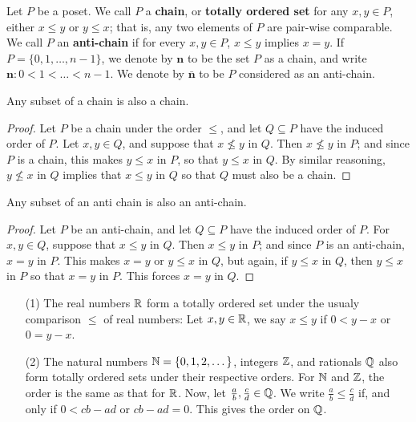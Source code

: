 \begin{definition}
  Let $P$ be a poset. We call $P$ a \textbf{chain}, or \textbf{totally
  ordered set} for any $x,y \in P$, either $x \leq y$ or $y \leq x$;
  that is, any two elements of $P$ are pair-wise comparable. We call
  $P$ an  \textbf{anti-chain} if for every $x,y \in P$, $x \leq y$
  implies $x=y$. If $P=\{0, 1, \dots, n-1\}$, we denote by
  $\textbf{n}$ to be the set $P$ as a chain, and write
  $\textbf{n}:0<1< \dots < n-1$. We denote by $\bar{\textbf{n}}$ to be
  $P$ considered as an anti-chain.
\end{definition}

\begin{lemma}\label{lemma_1.1.1}
  Any subset of a chain is also a chain.
\end{lemma}
\begin{proof}
  Let $P$ be a chain under the order $\leq$, and let $Q \subseteq P$
  have the induced order of $P$. Let  $x,y \in Q$, and suppose that $x
  \nleq y$ in $Q$. Then  $x \nleq y$ in $P$; and since $P$ is a chain,
  this makes  $y \leq x$ in $P$, so that  $y \leq x$ in $Q$.
  By similar reasoning,  $y \nleq x$ in $Q$ implies that $x \leq y$ in
  $Q$ so that $Q$ must also be a chain.
\end{proof}

\begin{lemma}\label{lemma_1.1.2}
  Any subset of an anti chain is also an anti-chain.
\end{lemma}
\begin{proof}
  Let $P$ be an anti-chain, and let $Q \subseteq P$ have the induced
  order of $P$. For  $x,y \in Q$, suppose that $x \leq y$ in $Q$. Then
   $x \leq y$ in $P$; and since $P$ is an anti-chain, $x=y$ in $P$.
   This makes $x=y$ or  $y \leq x$ in $Q$, but again, if  $y \leq x$
   in $Q$, then  $y \leq x$ in $P$ so that $x=y$ in $P$. This forces
   $x=y$ in $Q$.
\end{proof}

\begin{example}\label{example_1.2}
  \begin{enumerate}
    \item[(1)] The real numbers $\mathbb{R}$ form a totally ordered set under
      the usualy comparison $\leq$ of real numbers: Let $x,y \in \mathbb{R}$,
      we say $x \leq y$ if $0<y-x$ or $0=y-x$.

    \item[(2)] The natural numbers $\mathbb{N}=\{0, 1, 2, \dots\}$, integers
      $\mathbb{Z}$, and rationals $\mathbb{Q}$ also form totally ordered sets under
      their respective orders. For $\mathbb{N}$ and $\mathbb{Z}$, the order is the
      same as that for $\mathbb{R}$. Now, let $\frac{a}{b}, \frac{c}{d} \in
      \mathbb{Q}$. We write $\frac{a}{b} \leq \frac{c}{d}$ if, and only if
      $0<cb-ad$ or  $cb-ad=0$. This gives the order on $\mathbb{Q}$.
  \end{enumerate}
\end{example}

